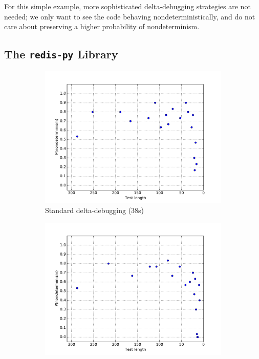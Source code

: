 For this simple example, more sophisticated delta-debugging strategies
are not needed; we only want to see the code behaving
nondeterministically, and do not care about preserving a higher probability of nondeterminism.

\subsection {The {\tt redis-py} Library}


\begin{figure}
\centering 
\begin{subfigure}{0.3\columnwidth}
\centering
\includegraphics[width=\columnwidth]{redisddmin}
\caption{Standard delta-debugging (38s)}
\label{fig:r1}
\end{subfigure}
\begin{subfigure}{0.3\columnwidth}
\centering
\includegraphics[width=\columnwidth]{redisforcep}

\end{subfigure}
\end{figure}
